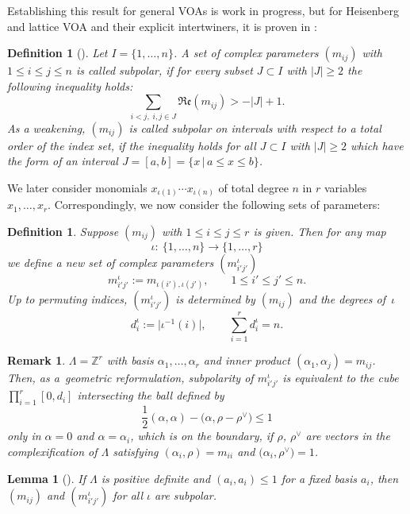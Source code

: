 \documentclass[10pt,a4paper]{amsart}
\numberwithin{equation}{section}
\newtheorem{lem}[teo]{Lemma}
\newtheorem{defin}[teo]{Definition}
\newtheorem{oss}[teo]{Remark} }
\newcommand{\Z}{\mathbb{Z}}
\begin{document}
Establishing this result for general VOAs is work in progress, but for Heisenberg and lattice VOA and their explicit intertwiners, it is proven in \cite{Len17}:
\begin{defin}[{\cite[Definition 5.4]{Len17}}]\label{def_smallnessF}
	Let $I=\{1,\dots,n\}$. A set of complex parameters $(m_{ij})$ with $1\leq i\leq j\leq n$ is called \emph{subpolar}, if for every subset $J\subset I$ with $|J|\geq 2$ the following inequality holds:
	\[\sum_{i<j,\;i,j\in J} \mathfrak{Re}(m_{ij}) > -|J|+1.\]
	As a weakening, $(m_{ij})$ is called \emph{subpolar on intervals} with respect to a total order of the index set, if the inequality holds for all $J\subset I$ with $|J|\geq 2$ which have the form of an interval $J=[a,b]=\{x\,|\, a\leq x \leq b\}$.
\end{defin}
We later consider monomials $x_{\iota(1)}\cdots x_{\iota(n)}$ of total degree $n$ in $r$ variables $x_1,\dots,x_r$. Correspondingly, we now consider the following sets of parameters:
\begin{defin}
Suppose $(m_{ij})$ with $1\leq i\leq j\leq r$ is given. Then for any map
\[\iota\colon \ \{1,\dots,n \}\to \{1,\dots, r\}\]
we define a new set of complex parameters $(m^\iota_{i'j'})$
\[m^\iota_{i'j'}:=m_{\iota(i'),\iota(j')},\qquad 1\leq i'\leq j'\leq n.\]
Up to permuting indices, $(m^\iota_{i'j'})$ is determined by $(m_{ij})$ and the \emph{degrees} of~$\iota$
\[d_i^\iota:=\big|\iota^{-1}(i)\big|,\qquad \sum_{i=1}^r d_i^\iota=n.\]
\end{defin}
\begin{oss}
		 $\Lambda=\Z^r$ with basis $\alpha_1,\dots,\alpha_r$ and inner product $(\alpha_1,\alpha_j)=m_{ij}$. Then, as a~geometric reformulation, subpolarity of $m^\iota_{i'j'}$ is equivalent to the cube $\prod_{i=1}^r[0,d_i]$ intersecting the ball defined by
\[\frac{1}{2}(\alpha,\alpha)-\big(\alpha,\rho-\rho^\vee\big)\leq 1\]
only in $\alpha=0$ and $\alpha=\alpha_i$, which is on the boundary, if $\rho$, $\rho^\vee$ are vectors in the complexification of $\Lambda$ satisfying $(\alpha_i,\rho)=m_{ii}$ and $\big(\alpha_i,\rho^\vee\big)=1$.
\end{oss}

\begin{lem}[{\cite[Lemma 5.5]{Len17}}]\label{pos+small} If $\Lambda$ is positive definite and $(a_i, a_i)\leq 1$ for a fixed basis $a_i$, then $(m_{ij})$ and $(m^\iota_{i'j'})$ for all $\iota$ are subpolar.
\end{lem}
\end{document}
